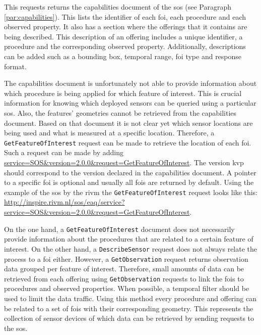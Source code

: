 This requests returns the capabilities document of the \ac{sos} (see Paragraph \ref{par:capabilities}). This lists the identifier of each \ac{foi}, each procedure and each observed property. It also has a section where the offerings that it contains are being described. This description of an offering includes a unique identifier, a procedure and the corresponding observed property. Additionally, descriptions can be added such as a bounding box, temporal range, \ac{foi} type and response format.  

\begin{sloppypar}
	The capabilities document is unfortunately not able to provide information about which procedure is being applied for which feature of interest. This is crucial information for knowing which deployed sensors can be queried using a particular \ac{sos}. Also, the features' geometries cannot be retrieved from the capabilities document. Based on that document it is not clear yet which sensor locations are being used and what is measured at a specific location. Therefore, a \texttt{GetFeatureOfInterest} request can be made to retrieve the location of each \ac{foi}. Such a request can be made by adding \url{service=SOS&version=2.0.0&request=GetFeatureOfInterest}. The version \ac{kvp} should correspond to the version declared in the capabilities document. A pointer to a specific \ac{foi} is optional and usually all \acp{foi} are returned by default. Using the example of the \ac{sos} by the \ac{rivm} the \texttt{GetFeatureOfInterest} request looks like this: \url{http://inspire.rivm.nl/sos/eaq/service?service=SOS&version=2.0.0&request=GetFeatureOfInterest}.    
\end{sloppypar}

On the one hand, a \texttt{GetFeatureOfInterest} document does not necessarily provide information about the procedures that are related to a certain feature of interest. On the other hand, a \texttt{DescribeSensor} request does not always relate the process to a \ac{foi} either. However, a \texttt{GetObservation} request returns observation data grouped per feature of interest. Therefore, small amounts of data can be retrieved from each offering using \texttt{GetObservation} requests to link the \acp{foi} to procedures and observed properties. When possible, a temporal filter should be used to limit the data traffic. Using this method every procedure and offering can be related to a set of \acp{foi} with their corresponding geometry. This represents the collection of sensor devices of which data can be retrieved by sending requests to the \ac{sos}. 

